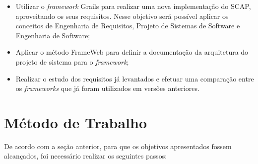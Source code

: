 \begin{itemize}

	\item Utilizar o \textit{framework} Grails para realizar uma nova implementação do SCAP, aproveitando os seus requisitos. Nesse objetivo será possível aplicar os conceitos de Engenharia de Requisitos, Projeto de Sistemas de Software e Engenharia de Software;
	\item Aplicar o método FrameWeb para definir a documentação da arquitetura do projeto de sistema para o \textit{framework};
    \item Realizar o estudo dos requisitos já levantados e efetuar uma comparação entre os \textit{frameworks} que já foram utilizados em versões anteriores.

\end{itemize}




\section{Método de Trabalho}
\label{sec-intro-metodo}

De acordo com a seção anterior, para que os objetivos apresentados fossem alcançados, foi necessário realizar os seguintes passos:

